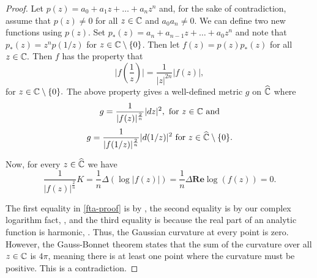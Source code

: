 \begin{proof}
 Let $p(z)=a_0+a_1z+\ldots + a_nz^n$ and, for the sake of contradiction,
 assume that $p(z)\neq 0$ for all $z\in \mathbb{C}$ and $a_0a_n\neq 0.$
 We can define two new functions using $p(z)$.
 Set $p_*(z)=a_n+a_{n-1}z+\ldots + a_0z^n$ and note that $p_*(z)=z^np(1/z)$ for $z\in \mathbb{C}\setminus\{0\}$.
 Then let $f(z)=p(z)p_*(z)$ for all $z\in \mathbb{C}.$
 Then $f$ has the property that
 $$\bigg | f\left(\frac{1}{z}\right) \bigg |=\frac{1}{|z|^{2n}}|f(z)|,$$ for $z\in \mathbb{C}\setminus\{0\}.$
 The above property gives a well-defined metric $g$ on $\widehat{\mathbb{C}}$
 where 
 $$g=\frac{1}{|f(z)|^{\frac{2}{n}}}|dz|^2, \textrm{ for } z\in \mathbb{C} \textrm{ and}$$
 $$g=\frac{1}{|f(1/z)|^{\frac{2}{n}}}|d(1/z)|^2 \textrm{ for } z\in \widehat{\mathbb{C}}\setminus\{0\}.$$
 
 Now, for every $z\in \widehat{\mathbb{C}}$ we have 
\begin{equation}\label{eq:fta-proof}
\frac{1}{|f(z)|^{\frac{2}{n}}} K =\frac{1}{n}\Delta(\log |f(z)|)=\frac{1}{n}\Delta \textbf{Re} \log(f(z))=0.
\end{equation}

 The first equality in \eqref{fta-proof} is by , the second equality is by our complex
 logarithm fact, , and the third equality is because the real part of an analytic function
 is harmonic, .
Thus, the Gaussian curvature at every point is zero. However, the Gauss-Bonnet
 theorem states that the sum of the curvature over all $z\in \mathbb{C}$ is $4\pi$, meaning there is at least
 one point where the curvature must be positive. This is a contradiction.
 
\end{proof}


